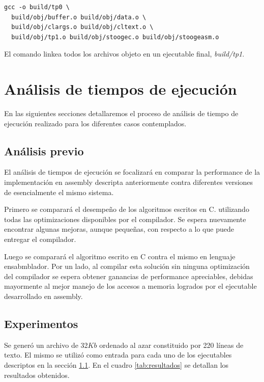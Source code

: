 \documentclass[a4paper,11pt]{article}
\begin{document}
\begin{lstlisting}
gcc -o build/tp0 \
  build/obj/buffer.o build/obj/data.o \
  build/obj/clargs.o build/obj/cltext.o \
  build/obj/tp1.o build/obj/stoogec.o build/obj/stoogeasm.o
\end{lstlisting}

El comando linkea todos los archivos objeto en un ejecutable final,
\textit{build/tp1}.

\section{Análisis de tiempos de ejecución}

En las siguientes secciones detallaremos el proceso de análisis de tiempo de
ejecución realizado para los diferentes casos contemplados.

\subsection{Análisis previo}\label{sec:tiempos}

El análisis de tiempos de ejecución se focalizará en comparar la performance de
la implementación en assembly descripta anteriormente contra diferentes
versiones de esencialmente el mismo sistema.

Primero se comparará el desempeño de los algoritmos escritos en C. utilizando todas las optimizaciones disponibles por el
compilador. Se espera nuevamente encontrar algunas mejoras, aunque pequeñas,
con respecto a lo que puede entregar el compilador.

Luego se comparará el algoritmo escrito en C contra el mismo en lenguaje ensabmblador.
Por un lado, al compilar esta solución sin ninguna optimización del compilador 
se espera obtener ganancias de performance apreciables, debidas mayormente al 
mejor manejo de los accesos a memoria logrados por el ejecutable desarrollado en assembly.

\subsection{Experimentos}

Se generó un archivo de 32\(Kb\) ordenado al azar constituido por 220 líneas de
texto. El mismo se utilizó como entrada para cada uno de los ejecutables
descriptos en la sección \ref{sec:tiempos}. En el cuadro \ref{tab:resultados}
se detallan los resultados obtenidos.
\end{document}
